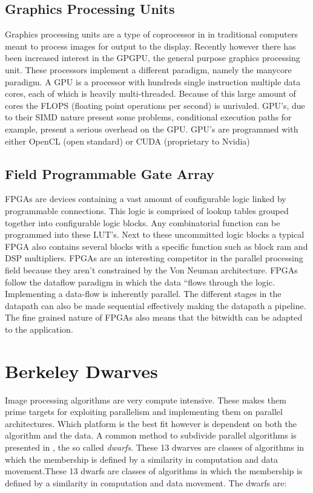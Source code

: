 \subsection{Graphics Processing Units} 
Graphics processing units are a type of coprocessor in in traditional computers meant to process images for output to the display. Recently however there has been increased interest in the GPGPU, the general purpose graphics processing unit. These processors implement a different paradigm, namely the manycore paradigm. A  GPU is a processor with hundreds single instruction multiple data cores, each of which is heavily multi-threaded. Because of this large amount of cores the FLOPS (floating point operations per second) is unrivaled\cite{kirk_programming_2010}. GPU's, due to their SIMD nature present some problems, conditional execution paths for example, present a serious overhead on the GPU. GPU's are programmed with either OpenCL (open standard) or CUDA (proprietary to Nvidia)

\subsection{Field Programmable Gate Array} 
FPGAs are devices containing a vast amount of configurable logic linked by programmable connections. This logic is comprised of lookup tables grouped together into configurable logic blocks. Any combinatorial function can be programmed into these LUT's. Next to these uncommitted logic blocks a typical FPGA also contains several blocks with a specific function such as block ram and DSP multipliers. FPGAs are an interesting competitor in the parallel processing field because they aren't constrained by the Von Neuman architecture. FPGAs follow the dataflow paradigm in which the data “flows through the logic. Implementing a data-flow is inherently parallel. The different stages in the datapath can also be made sequential effectively making the datapath a pipeline. The fine grained nature of FPGAs also means that the bitwidth can be adapted to the application.


\section{Berkeley Dwarves}

Image processing algorithms are very compute intensive. These makes them prime targets for exploiting parallelism and implementing them on parallel architectures. Which platform is the best fit however is dependent on both the algorithm and the data. A common method to subdivide parallel algorithms is presented in , the so called \emph{dwarfs}. These 13 dwarves are classes of algorithms in which the membership is defined by a similarity in computation and data movement.These 13 dwarfs are classes of algorithms in which the membership is defined by a similarity in computation and data movement.
The dwarfs are:

